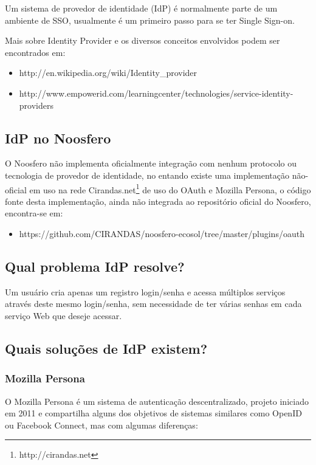 \documentclass[11pt]{article}
\begin{document}
Um sistema de provedor de identidade (IdP) é normalmente parte de um ambiente
de SSO, usualmente é um primeiro passo para se ter Single Sign-on.

Mais sobre Identity Provider e os diversos conceitos envolvidos podem ser
encontrados em:
\begin{itemize}
  \item{http://en.wikipedia.org/wiki/Identity\_provider}
  \item{http://www.empowerid.com/learningcenter/technologies/service-identity-providers}
\end{itemize}

\subsection{IdP no Noosfero}

O Noosfero não implementa oficialmente integração com nenhum protocolo ou
tecnologia de provedor de identidade, no entando existe uma implementação
não-oficial em uso na rede Cirandas.net\footnote{http://cirandas.net} de uso
do OAuth e Mozilla Persona, o código fonte desta implementação, ainda não
integrada ao repositório oficial do Noosfero, encontra-se em:

\begin{itemize}
  \item{https://github.com/CIRANDAS/noosfero-ecosol/tree/master/plugins/oauth}
\end{itemize}

\subsection{Qual problema IdP resolve?}

Um usuário cria apenas um registro login/senha e acessa múltiplos serviços
através deste mesmo login/senha, sem necessidade de ter várias senhas em cada
serviço Web que deseje acessar.

\subsection{Quais soluções de IdP existem?}

\subsubsection{Mozilla Persona}

O Mozilla Persona é um sistema de autenticação descentralizado, projeto
iniciado em 2011 e compartilha alguns dos objetivos de sistemas similares como
OpenID ou Facebook Connect, mas com algumas diferenças:
\end{document}
